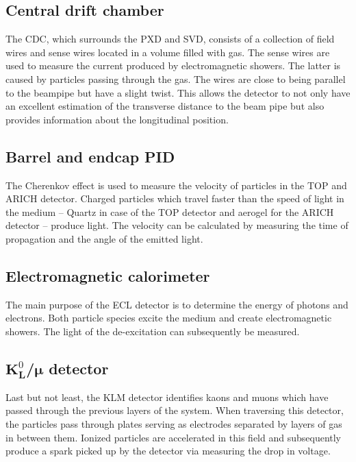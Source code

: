 \subsection{Central drift chamber}
\label{sec:detector_system_tracking_detectors}

The CDC, which surrounds the PXD and SVD, consists of a collection of field wires and sense wires located in a volume filled with gas. The sense wires are used to measure the current produced by electromagnetic showers. The latter is caused by particles passing through the gas. The wires are close to being parallel to the beampipe but have a slight twist. This allows the detector to not only have an excellent estimation of the transverse distance to the beam pipe but also provides information about the longitudinal position.

\subsection{Barrel and endcap PID}
\label{sec:detector_system_barrel_and_endcap_pid}

The Cherenkov effect is used to measure the velocity of particles in the TOP and ARICH detector. Charged particles which travel faster than the speed of light in the medium -- Quartz in case of the TOP detector and aerogel for the ARICH detector -- produce light. The velocity can be calculated by measuring the time of propagation and the angle of the emitted light.

\subsection{Electromagnetic calorimeter}
\label{sec:detector_system_electromagnetic_calorimeter}

The main purpose of the ECL detector is to determine the energy of photons and electrons. Both particle species excite the medium and create electromagnetic showers. The light of the de-excitation can subsequently be measured.

\subsection{$\boldsymbol{K}^0_{\boldsymbol{L}}$/$\boldsymbol{\mu}$ detector}
\label{sec:detector_system_k0lmu}

Last but not least, the KLM detector identifies kaons and muons which have passed through the previous layers of the system. When traversing this detector, the particles pass through plates serving as electrodes separated by layers of gas in between them. Ionized particles are accelerated in this field and subsequently produce a spark picked up by the detector via measuring the drop in voltage.

